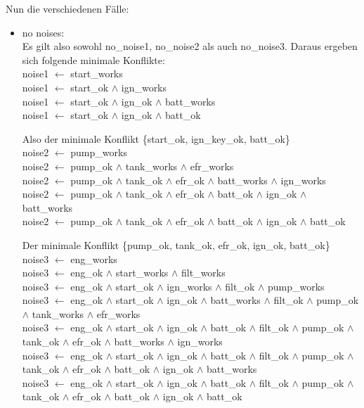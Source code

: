 \documentclass[ngerman]{fbi-aufgabenblatt}
\begin{document}
Nun die verschiedenen Fälle:
\begin{itemize}
\item no noises: \\
Es gilt also sowohl no\_noise1, no\_noise2 als auch no\_noise3.
Daraus ergeben sich folgende minimale Konflikte: \\

noise1 \(\leftarrow\) start\_works \\
noise1 \(\leftarrow\) start\_ok \(\land\) ign\_works \\
noise1 \(\leftarrow\) start\_ok \(\land\) ign\_ok \(\land\) batt\_works \\
noise1 \(\leftarrow\) start\_ok \(\land\) ign\_ok \(\land\) batt\_ok

Also der minimale Konflikt \{start\_ok, ign\_key\_ok, batt\_ok\} \\

noise2 \(\leftarrow\) pump\_works \\
noise2 \(\leftarrow\) pump\_ok \(\land\) tank\_works \(\land\) efr\_works \\
noise2 \(\leftarrow\) pump\_ok \(\land\) tank\_ok \(\land\) efr\_ok \(\land\) batt\_works \(\land\) ign\_works \\
noise2 \(\leftarrow\) pump\_ok \(\land\) tank\_ok \(\land\) efr\_ok \(\land\) batt\_ok \(\land\) ign\_ok \(\land\) batt\_works \\
noise2 \(\leftarrow\) pump\_ok \(\land\) tank\_ok \(\land\) efr\_ok \(\land\) batt\_ok \(\land\) ign\_ok \(\land\)  batt\_ok 

Der minimale Konflikt \{pump\_ok, tank\_ok, efr\_ok, ign\_ok, batt\_ok\} \\

noise3 \(\leftarrow\) eng\_works \\
noise3 \(\leftarrow\) eng\_ok \(\land\) start\_works \(\land\) filt\_works \\
noise3 \(\leftarrow\) eng\_ok \(\land\) start\_ok \(\land\) ign\_works \(\land\) filt\_ok \(\land\) pump\_works \\
noise3 \(\leftarrow\) eng\_ok \(\land\) start\_ok \(\land\) ign\_ok \(\land\) batt\_works \(\land\) filt\_ok \(\land\) pump\_ok \(\land\) tank\_works \(\land\) efr\_works \\
noise3 \(\leftarrow\) eng\_ok \(\land\) start\_ok \(\land\) ign\_ok \(\land\) batt\_ok \(\land\) filt\_ok \(\land\) pump\_ok \(\land\) tank\_ok \(\land\) efr\_ok \(\land\) batt\_works \(\land\) ign\_works \\
noise3 \(\leftarrow\) eng\_ok \(\land\) start\_ok \(\land\) ign\_ok \(\land\) batt\_ok \(\land\) filt\_ok \(\land\) pump\_ok \(\land\) tank\_ok \(\land\) efr\_ok \(\land\) batt\_ok \(\land\) ign\_ok \(\land\) batt\_works \\
noise3 \(\leftarrow\) eng\_ok \(\land\) start\_ok \(\land\) ign\_ok \(\land\) batt\_ok \(\land\) filt\_ok \(\land\) pump\_ok \(\land\) tank\_ok \(\land\) efr\_ok \(\land\) batt\_ok \(\land\) ign\_ok \(\land\)  batt\_ok


\end{itemize}
\end{document}
